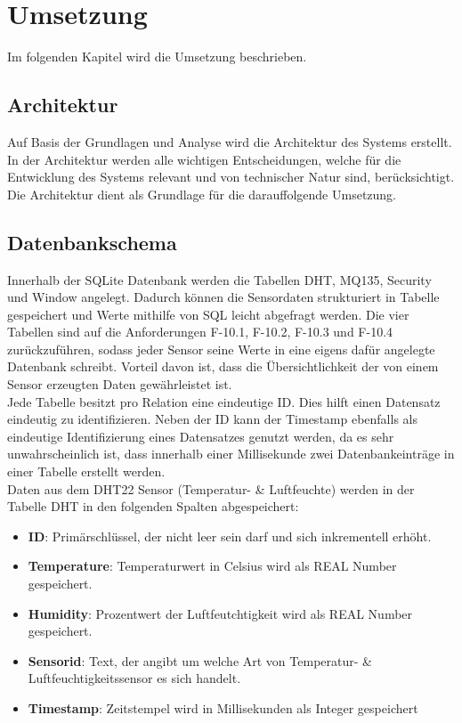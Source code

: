 \chapter{Umsetzung} \label{sec:Umsetzung}
Im folgenden Kapitel wird die Umsetzung beschrieben.
\section{Architektur}
Auf Basis der Grundlagen und Analyse wird die Architektur des Systems erstellt.
In der Architektur werden alle wichtigen Entscheidungen, welche für die
Entwicklung des Systems relevant und von technischer Natur sind, berücksichtigt. Die Architektur dient als Grundlage für die darauffolgende Umsetzung.

\section{Datenbankschema}\label{db:DB}
Innerhalb der SQLite Datenbank werden die Tabellen DHT, MQ135, Security und Window angelegt. Dadurch können die Sensordaten strukturiert in Tabelle gespeichert und Werte mithilfe von \acf{SQL} leicht abgefragt werden. Die vier Tabellen sind auf die Anforderungen F-10.1, F-10.2, F-10.3 und F-10.4 zurückzuführen, sodass jeder Sensor seine Werte in eine eigens dafür angelegte Datenbank schreibt. Vorteil davon ist, dass die Übersichtlichkeit der von einem Sensor erzeugten Daten gewährleistet ist.\\
Jede Tabelle besitzt pro Relation eine eindeutige ID. Dies hilft einen Datensatz eindeutig zu identifizieren. Neben der ID kann der Timestamp ebenfalls als eindeutige Identifizierung eines Datensatzes genutzt werden, da es sehr unwahrscheinlich ist, dass innerhalb einer Millisekunde zwei Datenbankeinträge in einer Tabelle erstellt werden.\\

Daten aus dem DHT22 Sensor (Temperatur- \& Luftfeuchte) werden in der Tabelle DHT in den folgenden Spalten abgespeichert:
\begin{itemize}
	\item \textbf{ID}: Primärschlüssel, der nicht leer sein darf und sich inkrementell erhöht.  
	\item \textbf{Temperature}: Temperaturwert in Celsius wird als REAL Number gespeichert.
	\item \textbf{Humidity}: Prozentwert der Luftfeutchtigkeit wird als REAL Number gespeichert.
	\item \textbf{Sensorid}: Text, der angibt um welche Art von Temperatur- \& Luftfeuchtigkeitssensor es sich handelt.
	\item \textbf{Timestamp}: Zeitstempel wird in Millisekunden als Integer gespeichert
\end{itemize}

